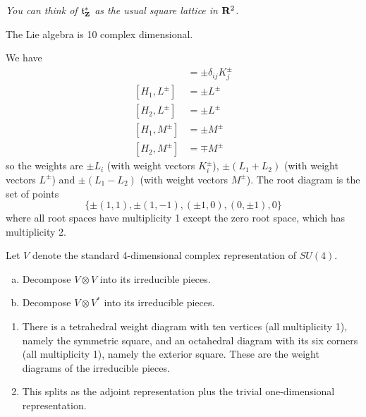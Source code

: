 \documentclass[12pt]{article}
\begin{document}
\begin{question}
{\em You can think of $\mathfrak{t}^*_{\mathbf{Z}}$ as the usual square lattice in $\mathbf{R}^2$.}
\end{question}

\begin{answer}
The Lie algebra is 10 complex dimensional.

We have
\begin{align*}
[H_i,K_j^{\pm}]&=\pm \delta_{ij}K_j^{\pm}\\
[H_1,L^{\pm}]&=\pm L^{\pm}\\
[H_2,L^{\pm}]&=\pm L^{\pm}\\
[H_1,M^{\pm}]&=\pm M^{\pm}\\
[H_2,M^{\pm}]&=\mp M^{\pm}
\end{align*}
so the weights are $\pm L_i$ (with weight vectors $K_i^{\pm}$), $\pm (L_1+L_2)$ (with weight vectors $L^{\pm}$) and $\pm (L_1-L_2)$ (with weight vectors $M^{\pm}$). The root diagram is the set of points
\[\{\pm(1,1),\pm(1,-1),(\pm 1,0),(0,\pm 1),0\}\]
where all root spaces have multiplicity 1 except the zero root space, which has multiplicity 2.
\end{answer}
\newpage

\bigskip

\begin{question}
Let $V$ denote the standard 4-dimensional complex representation of $SU(4)$.
\begin{enumerate}[(a)]
\item Decompose $V\otimes V$ into its irreducible pieces.
\item Decompose $V\otimes V^*$ into its irreducible pieces.
\end{enumerate}
\end{question}

\begin{answer}
\begin{enumerate}
\item There is a tetrahedral weight diagram with ten vertices (all multiplicity 1), namely the symmetric square, and an octahedral diagram with its six corners (all multiplicity 1), namely the exterior square. These are the weight diagrams of the irreducible pieces.
\item This splits as the adjoint representation plus the trivial one-dimensional representation.
\end{enumerate}
\end{answer}
\newpage




\end{document}
